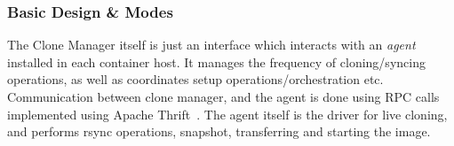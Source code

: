 \subsubsection{Basic Design \& Modes}


The Clone Manager itself is just an interface which interacts with an \textit{agent} installed in each container host.
It manages the frequency of cloning/syncing operations, as well as  coordinates setup operations/orchestration etc.
Communication between clone manager, and the agent is done using RPC calls implemented using Apache Thrift~\cite{thrift}.
The agent itself is the driver for live cloning, and performs rsync operations, snapshot, transferring and starting the image.
\fi
